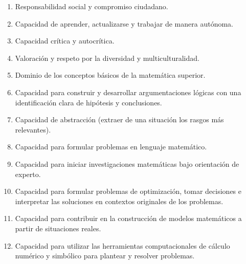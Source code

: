 \documentclass[a4paper, 12pt]{article}
\begin{document}
\begin{enumerate}

\item {Responsabilidad social y compromiso
ciudadano.} 



\item {Capacidad de aprender, actualizarse y trabajar de manera autónoma.} 
 


\item {Capacidad crítica y autocrítica.} 
 

\item {Valoración y respeto por la diversidad
y multiculturalidad.} 
 




\item {Dominio de los conceptos básicos
de la matemática superior.} 
 

\item {Capacidad para construir y desarrollar
argumentaciones lógicas con una
identificación clara de hipótesis y conclusiones.} 
 
\item {Capacidad de abstracción (extraer de una situación los rasgos más relevantes).} 
 


\item {Capacidad para formular problemas
en lenguaje matemático.} 
 

  


\item {Capacidad para iniciar investigaciones
matemáticas bajo orientación de experto.} 
 


\item {Capacidad para formular problemas
de optimización, tomar decisiones e interpretar
las soluciones en contextos originales
de los problemas.} 
 


\item {Capacidad para contribuir en la
construcción de modelos matemáticos a
partir de situaciones reales.} 
 


\item {Capacidad para utilizar las herramientas
computacionales de cálculo numérico
y simbólico para plantear y resolver
problemas.} 
 



\end{enumerate}
\end{document}
